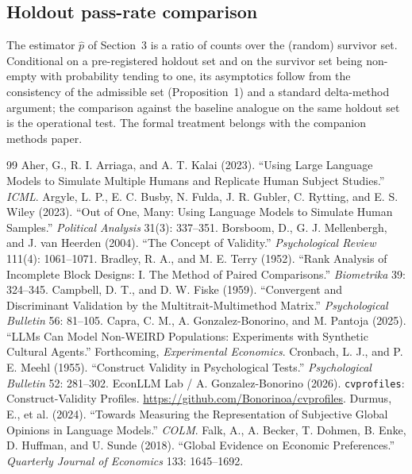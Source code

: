 \documentclass[10pt,letterpaper]{article}
\begin{document}
\subsection{Holdout pass-rate comparison}
The estimator $\hat p$ of Section~3 is a ratio of counts over the (random) survivor set. Conditional on a pre-registered holdout set and on the survivor set being non-empty with probability tending to one, its asymptotics follow from the consistency of the admissible set (Proposition~1) and a standard delta-method argument; the comparison against the baseline analogue on the same holdout set is the operational test. The formal treatment belongs with the companion methods paper.

\begin{thebibliography}{99}\small
{} Aher, G., R. I. Arriaga, and A. T. Kalai (2023). ``Using Large Language Models to Simulate Multiple Humans and Replicate Human Subject Studies.'' \textit{ICML}.
 Argyle, L. P., E. C. Busby, N. Fulda, J. R. Gubler, C. Rytting, and E. S. Wiley (2023). ``Out of One, Many: Using Language Models to Simulate Human Samples.'' \textit{Political Analysis} 31(3): 337--351.
 Borsboom, D., G. J. Mellenbergh, and J. van Heerden (2004). ``The Concept of Validity.'' \textit{Psychological Review} 111(4): 1061--1071.
 Bradley, R. A., and M. E. Terry (1952). ``Rank Analysis of Incomplete Block Designs: I. The Method of Paired Comparisons.'' \textit{Biometrika} 39: 324--345.
 Campbell, D. T., and D. W. Fiske (1959). ``Convergent and Discriminant Validation by the Multitrait-Multimethod Matrix.'' \textit{Psychological Bulletin} 56: 81--105.
 Capra, C. M., A. Gonzalez-Bonorino, and M. Pantoja (2025). ``LLMs Can Model Non-WEIRD Populations: Experiments with Synthetic Cultural Agents.'' Forthcoming, \textit{Experimental Economics}.
 Cronbach, L. J., and P. E. Meehl (1955). ``Construct Validity in Psychological Tests.'' \textit{Psychological Bulletin} 52: 281--302.
 EconLLM Lab / A. Gonzalez-Bonorino (2026). \texttt{cvprofiles}: Construct-Validity Profiles. \url{https://github.com/Bonorinoa/cvprofiles}.
 Durmus, E., et al. (2024). ``Towards Measuring the Representation of Subjective Global Opinions in Language Models.'' \textit{COLM}.
 Falk, A., A. Becker, T. Dohmen, B. Enke, D. Huffman, and U. Sunde (2018). ``Global Evidence on Economic Preferences.'' \textit{Quarterly Journal of Economics} 133: 1645--1692.

\end{thebibliography}
\end{document}
